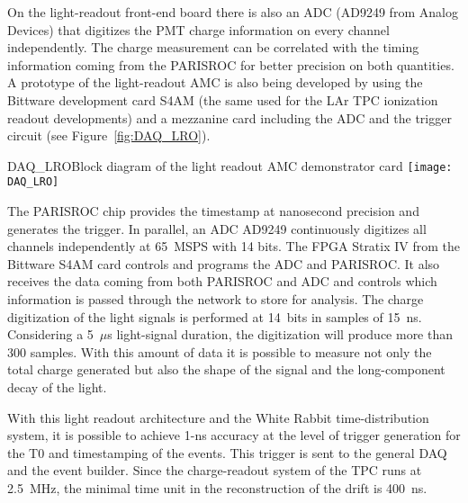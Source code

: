 On the light-readout front-end board there is also an ADC (AD9249 from Analog Devices) that digitizes the PMT charge information on every
channel independently. The charge measurement can be correlated with the timing information coming from the PARISROC for better precision on both quantities. A prototype of the light-readout AMC is also being developed  by using the Bittware development card S4AM (the same used for the LAr TPC ionization readout developments) and a mezzanine card including the ADC and the trigger circuit (see Figure~\ref{fig:DAQ_LRO}).

\begin{cdrfigure}{DAQ_LRO}{Block diagram of the light readout AMC demonstrator card}
 \texttt{[image: DAQ\_LRO]}  
\end{cdrfigure}

The PARISROC chip provides the timestamp at nanosecond precision and generates the trigger. In parallel,  an ADC AD9249 continuously digitizes all channels independently at 65~MSPS with 14 bits. The FPGA Stratix IV from the Bittware S4AM card controls and programs the ADC and PARISROC. It also receives the data coming from both PARISROC and ADC and controls which information is passed through the network to store for analysis.  The charge
digitization of the light signals is performed at 14~bits in samples of 15~ns. Considering a 5~$\mu$s light-signal duration, the digitization will produce more than 300 samples. With this amount of data it is possible to measure not only the total charge generated but also the shape of the signal and the long-component decay of the light.




With this light readout architecture and the White Rabbit time-distribution  system, it is possible to achieve 1-ns accuracy at the
level of trigger generation for the T0 and timestamping of the events. This trigger is sent to the general DAQ and the event
builder. Since the charge-readout system of the TPC runs at 2.5~MHz, the minimal time unit in the reconstruction of the drift is 400~ns.
